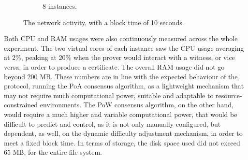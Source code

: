 \begin{figure} [h!]
\begin{subfigure}[b]{\textwidth}
        \caption{8 instances.}
        \label{fig:blockchain-blocks-generation-8-instances}
    \end{subfigure}
    \caption{The network activity, with a block time of 10 seconds.}
    \label{fig:blockchain-blocks-generation}
\end{figure}

Both CPU and RAM usages were also continuously measured across the whole experiment. The two virtual cores of each instance saw the CPU usage averaging at 2\%, peaking at 20\% when the prover would interact with a witness, or vice versa, in order to produce a \pol{} certificate. The overall RAM usage did not go beyond 200 MB. These numbers are in line with the expected behaviour of the protocol, running the PoA consensus algorithm, as a lightweight mechanism that may not require much computational power, suitable and adaptable to resource-constrained environments. The PoW consensus algorithm, on the other hand, would require a much higher and variable computational power, that would be difficult to predict and control, as it is not only manually configured, but dependent, as well, on the dynamic difficulty adjustment mechanism, in order to meet a fixed block time. In terms of storage, the disk space used did not exceed 65 MB, for the entire file system.

